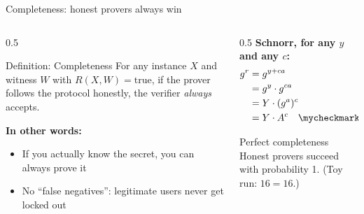 \ifdefined\PRESENTATION\else\PassOptionsToClass{handout}{beamer}\fi\documentclass[aspectratio=169, lualatex]{beamer}
\begin{document}
\begin{frame}{Completeness: honest provers always win}
	\begin{columns}[c]
		\begin{column}{0.5\textwidth}
			\begin{block}{Definition: Completeness}
				For any instance $X$ and witness $W$ with $R(X,W) = \text{true}$, if the prover follows the protocol honestly, the verifier \textit{always} accepts.
			\end{block}
			\textbf{In other words:}
			\begin{itemize}
				\item If you actually know the secret, you can always prove it
				\item No ``false negatives'': legitimate users never get locked out
			\end{itemize}
		\end{column}
		\begin{column}{0.5\textwidth}
			\textbf{Schnorr, for any $y$ and any $c$:}
			\begin{align*}
				g^r & = g^{y + ca}                     \\
				    & = g^y \cdot g^{ca}               \\
				    & = Y \cdot (g^a)^c                \\
				    & = Y \cdot A^c \quad \mycheckmark
			\end{align*}
			\begin{exampleblock}{Perfect completeness}
				Honest provers succeed with probability 1. (Toy run: $16 = 16$.)
			\end{exampleblock}
		\end{column}
	\end{columns}
\end{frame}
\end{document}
